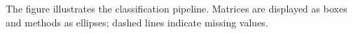 \label{fig:pipeline} The figure illustrates the classification pipeline. Matrices are displayed as boxes and methods as ellipses; dashed lines indicate missing values. 